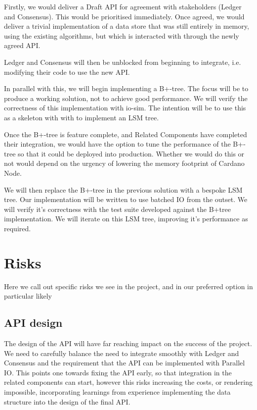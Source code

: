 \documentclass[11pt,a4paper]{article}
\begin{document}
Firstly, we would deliver a Draft API for agreement with stakeholders (Ledger
and Consensus). This would be prioritised immediately. Once agreed, we would
deliver a trivial implementation of a data store that was still entirely in
memory, using the existing algorithms, but which is interacted with through the
newly agreed API.

Ledger and Consensus will then be unblocked from beginning to integrate, i.e.
modifying their code to use the new API.

In parallel with this, we will begin implementing a B+-tree. The focus will
be to produce a working solution, not to achieve good performance. We
will verify the correctness of this implementation with io-sim. The intention
will be to use this as a skeleton with with to implement an LSM tree.

Once the B+-tree is feature complete, and Related Components have completed
their integration, we would have the option to tune the performance of the
B+-tree so that it could be deployed into production. Whether we would do this
or not would depend on the urgency of lowering the memory footprint of Cardano
Node.

We will then replace the B+-tree in the previous solution with a bespoke LSM tree.
Our implementation will be written to use batched IO from the outset. We will
verify it's correctness with the test suite developed against the B+tree
implementation. We will iterate on this LSM tree, improving it's performance
as required.

\section{Risks}

Here we call out specific risks we see in the project, and in our preferred option in particular
likely

\subsection{API design}
The design of the API will have far reaching impact on the success of the
project. We need to carefully balance the need to integrate smoothly with Ledger
and Consensus and the requirement that the API can be implemented with Parallel
IO. This points one towards fixing the API early, so that integration in the
related components can start, however this risks increasing the costs, or
rendering impossible,  incorporating learnings from experience implementing the
data structure into the design of the final API.
\end{document}
